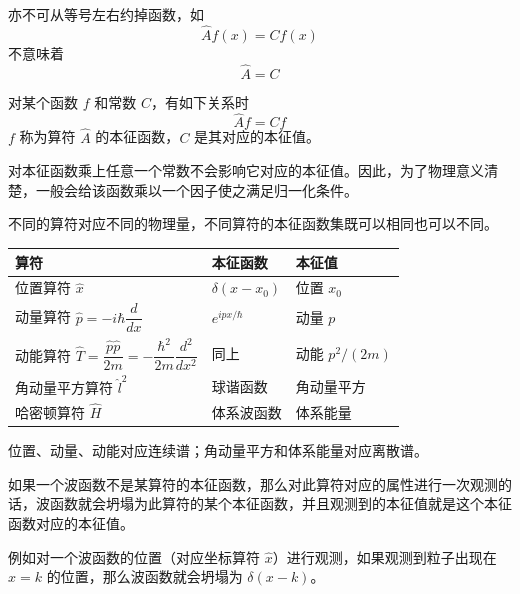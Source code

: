 亦不可从等号左右约掉函数，如
\[
\hat A f(x)=C f(x)
\]
不意味着
\[
\hat A=C
\]

对某个函数 $f$ 和常数 $C$，有如下关系时
\[
\hat A f=Cf
\]
$f$ 称为算符 $\hat A$ 的本征函数，$C$ 是其对应的本征值。

对本征函数乘上任意一个常数不会影响它对应的本征值。因此，为了物理意义清楚，一般会给该函数乘以一个因子使之满足归一化条件。

不同的算符对应不同的物理量，不同算符的本征函数集既可以相同也可以不同。

\begin{center}
\renewcommand{\arraystretch}{1.45}
\begin{tabular}{|>{\centering\arraybackslash}p{}|>{\centering\arraybackslash}p{}|>{\centering\arraybackslash}p{}|}
\hline
算符 & 本征函数 & 本征值 \\
\hline
位置算符 $\hat x$ & $\delta(x-x_0)$ & 位置 $x_0$ \\
\hline
动量算符 $\hat p=-i\hbar\dfrac{d}{dx}$ & $e^{ipx/\hbar}$ & 动量 $p$ \\
\hline
动能算符 $\hat T=\dfrac{\hat p\hat p}{2m}=-\dfrac{\hbar^2}{2m}\dfrac{d^2}{dx^2}$ & 同上 & 动能 $p^2/(2m)$ \\
\hline
角动量平方算符 $\hat l^2$ & 球谐函数 & 角动量平方 \\
\hline
哈密顿算符 $\hat H$ & 体系波函数 & 体系能量 \\
\hline
\end{tabular}
\end{center}

位置、动量、动能对应连续谱；角动量平方和体系能量对应离散谱。

如果一个波函数不是某算符的本征函数，那么对此算符对应的属性进行一次观测的话，波函数就会坍塌为此算符的某个本征函数，并且观测到的本征值就是这个本征函数对应的本征值。

例如对一个波函数的位置（对应坐标算符 $\hat x$）进行观测，如果观测到粒子出现在 $x=k$ 的位置，那么波函数就会坍塌为 $\delta(x-k)$。

\begin{center}
\end{center}

